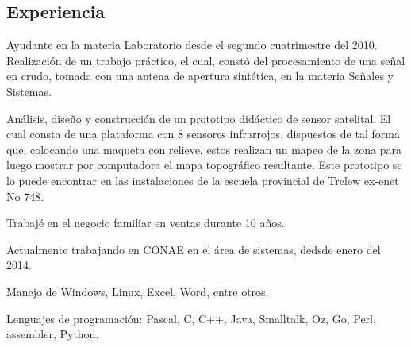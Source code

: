 \documentclass[a4paper,10pt]{article}
\begin{document}
\subsection*{Experiencia}
Ayudante en la materia Laboratorio desde el segundo cuatrimestre del 2010.
Realización de un trabajo práctico, el cual, constó del procesamiento de una 
señal en crudo, tomada con una antena de apertura sintética, en la materia 
Señales y Sistemas.

Análisis, diseño y construcción de un prototipo didáctico de sensor satelital. 
El cual consta de una plataforma con 8 sensores infrarrojos, dispuestos de tal 
forma que, colocando una maqueta con relieve, estos realizan un mapeo de la 
zona para luego mostrar por computadora el mapa topográfico resultante. Este 
prototipo se lo puede encontrar en las instalaciones de la escuela provincial 
de Trelew ex-enet No 748.

Trabajé en el negocio familiar en ventas durante 10 años.

Actualmente trabajando en CONAE en el área de sistemas, dedsde enero del 2014.

Manejo de Windows, Linux, Excel, Word, entre otros.

Lenguajes de programación: Pascal, C, C++, Java, Smalltalk, Oz, Go, Perl,
assembler, Python.

\newpage
\end{document}
